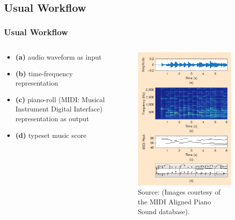 \documentclass{beamer}
\newcommand{\emp}[1]{\textcolor{tum}{\textbf{#1}}}
\begin{document}
\subsection{Usual Workflow}
\begin{frame}[shrink=10]
	\frametitle{Usual Workflow}

	\begin{columns}

		\begin{column}{0.5\textwidth}
			\begin{itemize}
				\vspace{2mm}
				\item \emp{(a)} audio waveform as input
				      \vspace{2mm}
				\item \emp{(b)} time-frequency representation
				      \vspace{2mm}
				\item \emp{(c)} piano-roll (MIDI: Musical Instrument Digital Interface) representation as output
				      \vspace{2mm}
				\item \emp{(d)} typeset music score
			\end{itemize}
		\end{column}

		\begin{column}{0.5\textwidth}
			\begin{figure}[!ht]
				\centering
				\includegraphics[width=.7\textwidth]{workflow.png}
				\caption{Source: \cite{Overview} (Images courtesy of the MIDI Aligned Piano Sound database).}
				\label{fig:workflow}
			\end{figure}
		\end{column}

	\end{columns}
\end{frame}
\end{document}
